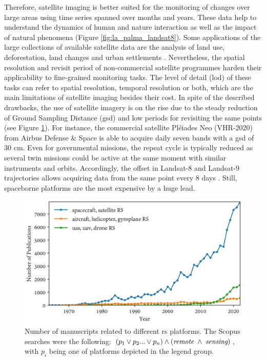Therefore, satellite imaging is better suited for the monitoring of changes over large areas using time series spanned over months and years. These data help to understand the dynamics of human and nature interaction as well as the impact of natural phenomena (Figure \ref{fig:la_palma_landsat8}). Some applications of the large collections of available satellite data are the analysis of land use, deforestation, land changes and urban settlements \cite{asokan_change_2019}. Nevertheless, the spatial resolution and revisit period of non-commercial satellite programmes harden their applicability to fine-grained monitoring tasks. The level of detail (\acrshort{lod}) of these tasks can refer to spatial resolution, temporal resolution or both, which are the main limitations of satellite imaging besides their cost. In spite of the described drawbacks, the use of satellite imagery is on the rise due to the steady reduction of Ground Sampling Distance (\acrshort{gsd}) and low periods for revisiting the same points (see Figure \ref{fig:scopus_search_platforms}). For instance, the commercial satellite Pléiades Neo (VHR-2020) from Airbus Defense \& Space \cite{airbus_pleiades_2021} is able to acquire daily seven bands with a \acrshort{gsd} of 30 \si{\centi\meter}. Even for governmental missions, the repeat cycle is typically reduced as several twin missions could be active at the same moment with similar instruments and orbits. Accordingly, the offset in Landsat-8 and Landsat-9 trajectories allows acquiring data from the same point every 8 days \cite{masek_landsat_2020}. Still, spaceborne platforms are the most expensive by a huge lead.

\begin{figure}[!ht]
	\includegraphics[width=\linewidth]{figs/introduction/platform_timeline.png}
	\caption{Number of manuscripts related to different \acrshort{rs} platforms. The Scopus searches were the following: $(p_1 \lor p_2 ... \lor p_n) \land (\textit{remote} \hspace{1mm} \land \hspace{1mm} \textit{sensing})$, with $p_i$ being one of platforms depicted in the legend group. }
    \label{fig:scopus_search_platforms}
\end{figure}

